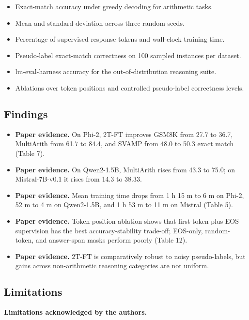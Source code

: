 \documentclass[11pt]{article}
\begin{document}
\begin{itemize}
\item
  Exact-match accuracy under greedy decoding for arithmetic tasks.
\item
  Mean and standard deviation across three random seeds.
\item
  Percentage of supervised response tokens and wall-clock training time.
\item
  Pseudo-label exact-match correctness on 100 sampled instances per
  dataset.
\item
  lm-eval-harness accuracy for the out-of-distribution reasoning suite.
\item
  Ablations over token positions and controlled pseudo-label correctness
  levels.
\end{itemize}

\subsection{Findings}\label{findings-1}

\begin{itemize}
\item
  \textbf{Paper evidence.} On Phi-2, 2T-FT improves GSM8K from 27.7 to 36.7, MultiArith
  from 61.7 to 84.4, and SVAMP from 48.0 to 50.3 exact match (Table 7).
\item
  \textbf{Paper evidence.} On Qwen2-1.5B, MultiArith rises from 43.3 to 75.0; on
  Mistral-7B-v0.1 it rises from 14.3 to 38.33.
\item
  \textbf{Paper evidence.} Mean training time drops from 1 h 15 m to 6 m on Phi-2, 52 m
  to 4 m on Qwen2-1.5B, and 1 h 53 m to 11 m on Mistral (Table 5).
\item
  \textbf{Paper evidence.} Token-position ablation shows that first-token plus EOS
  supervision has the best accuracy-stability trade-off; EOS-only,
  random-token, and answer-span masks perform poorly (Table 12).
\item
  \textbf{Paper evidence.} 2T-FT is comparatively robust to noisy pseudo-labels, but
  gains across non-arithmetic reasoning categories are not uniform.
\end{itemize}

\subsection{Limitations}\label{limitations-1}

\textbf{Limitations acknowledged by the authors.}
\end{document}
